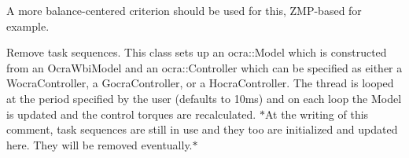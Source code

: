 
\begin{DoxyRefList}
\item[\label{todo__todo000002}%
\hypertarget{todo__todo000002}{}%
\-Member \hyperlink{classSteppingDemoClient_ad8fbc186267a47a73bb77e78199f2b8c}{\-Stepping\-Demo\-Client\-:\-:is\-Balanced} ()]\-A more balance-\/centered criterion should be used for this, \-Z\-M\-P-\/based for example.  
\item[\label{todo__todo000001}%
\hypertarget{todo__todo000001}{}%
\-Class \hyperlink{classThread}{\-Thread} ]\-Remove task sequences. \-This class sets up an ocra\-::\-Model which is constructed from an \-Ocra\-Wbi\-Model and an ocra\-::\-Controller which can be specified as either a \-Wocra\-Controller, a \-Gocra\-Controller, or a \-Hocra\-Controller. \-The thread is looped at the period specified by the user (defaults to 10ms) and on each loop the \-Model is updated and the control torques are recalculated. $\ast$\-At the writing of this comment, task sequences are still in use and they too are initialized and updated here. \-They will be removed eventually.$\ast$ 
\end{DoxyRefList}